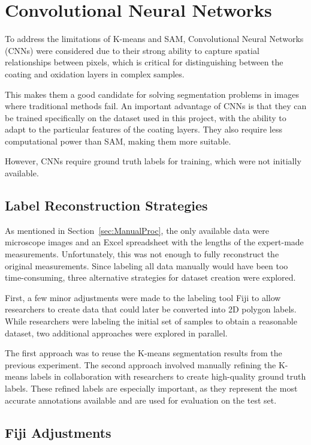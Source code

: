 
\section{Convolutional Neural Networks}\label{sec:cnn}
To address the limitations of K-means and SAM, Convolutional Neural Networks (CNNs) \cite{oshea_introduction_2015} were considered due to their strong ability to capture spatial relationships between pixels, which is critical for distinguishing between the coating and oxidation layers in complex samples.


This makes them a good candidate for solving segmentation problems in images where traditional methods fail. An important advantage of CNNs is that they can be trained specifically on the dataset used in this project, with the ability to adapt to the particular features of the coating layers. They also require less computational power than SAM, making them more suitable.

However, CNNs require ground truth labels for training, which were not initially available.
\subsection{Label Reconstruction Strategies}\label{sec:label_reconstruction}
As mentioned in Section~\ref{sec:ManualProc}, the only available data were microscope images and an Excel spreadsheet with the lengths of the expert-made measurements. Unfortunately, this was not enough to fully reconstruct the original measurements. Since labeling all data manually would have been too time-consuming, three alternative strategies for dataset creation were explored.

First, a few minor adjustments were made to the labeling tool Fiji to allow researchers to create data that could later be converted into 2D polygon labels. While researchers were labeling the initial set of samples to obtain a reasonable dataset, two additional approaches were explored in parallel.

The first approach was to reuse the K-means segmentation results from the previous experiment. The second approach involved manually refining the K-means labels in collaboration with researchers to create high-quality ground truth labels. These refined labels are especially important, as they represent the most accurate annotations available and are used for evaluation on the test set.



\subsection{Fiji Adjustments}\label{sec:1.2.2}

